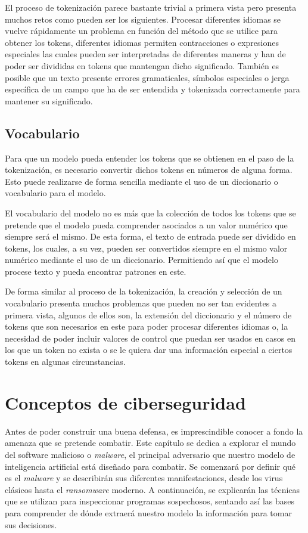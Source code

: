 El proceso de tokenización parece bastante trivial a primera vista pero presenta muchos retos como pueden ser los siguientes. Procesar diferentes idiomas se vuelve rápidamente un problema en función del método que se utilice para obtener los tokens, diferentes idiomas permiten contracciones o expresiones especiales las cuales pueden ser interpretadas de diferentes maneras y han de poder ser divididas en tokens que mantengan dicho significado. También es posible que un texto presente errores gramaticales, símbolos especiales o jerga específica de un campo que ha de ser entendida y tokenizada correctamente para mantener su significado.

\subsection{Vocabulario}

Para que un modelo pueda entender los tokens que se obtienen en el paso de la tokenización, es necesario convertir dichos tokens en números de alguna forma. Esto puede realizarse de forma sencilla mediante el uso de un diccionario o vocabulario para el modelo.

El vocabulario del modelo no es más que la colección de todos los tokens que se pretende que el modelo pueda comprender asociados a un valor numérico que siempre será el mismo. De esta forma, el texto de entrada puede ser dividido en tokens, los cuales, a su vez, pueden ser convertidos siempre en el mismo valor numérico mediante el uso de un diccionario. Permitiendo así que el modelo procese texto y pueda encontrar patrones en este.

De forma similar al proceso de la tokenización, la creación y selección de un vocabulario presenta muchos problemas que pueden no ser tan evidentes a primera vista, algunos de ellos son, la extensión del diccionario y el número de tokens que son necesarios en este para poder procesar diferentes idiomas o, la necesidad de poder incluir valores de control que puedan ser usados en casos en los que un token no exista o se le quiera dar una información especial a ciertos tokens en algunas circunstancias.

\section{Conceptos de ciberseguridad}

Antes de poder construir una buena defensa, es imprescindible conocer a fondo la amenaza que se pretende combatir. Este capítulo se dedica a explorar el mundo del software malicioso o \textit{malware}, el principal adversario que nuestro modelo de inteligencia artificial está diseñado para combatir. Se comenzará por definir qué es el \textit{malware} y se describirán sus diferentes manifestaciones, desde los virus clásicos hasta el \textit{ransomware} moderno. A continuación, se explicarán las técnicas que se utilizan para inspeccionar programas sospechosos, sentando así las bases para comprender de dónde extraerá nuestro modelo la información para tomar sus decisiones.

